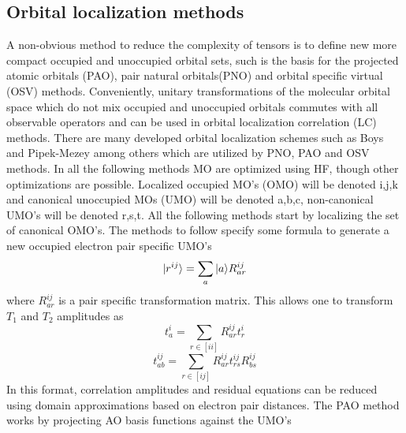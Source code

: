 	\subsection{Orbital localization methods}
		A non-obvious method to reduce the complexity of tensors is to define new more compact occupied and unoccupied orbital sets, such is the basis for the projected atomic orbitals (PAO), pair natural orbitals(PNO) and orbital specific virtual (OSV) methods. Conveniently, unitary transformations of the molecular orbital space which do not mix occupied and unoccupied orbitals commutes with all observable operators\cite{SzaboAttila1982} and can be used in orbital localization correlation (LC) methods. There are many developed orbital localization schemes such as Boys and Pipek-Mezey\cite{Boughton1993} among others which are utilized by PNO, PAO and OSV methods.  In all the following methods MO are optimized using HF, though other optimizations are possible. Localized occupied MO's (OMO) will be denoted i,j,k and canonical unoccupied MOs (UMO) will be denoted a,b,c, non-canonical UMO's will be denoted r,s,t.  All the following methods start by localizing the set of canonical OMO's. The methods to follow specify some formula to generate a new occupied electron pair specific UMO's 
			\begin{equation}
				| r^{ij} \rangle = \sum_a | a \rangle R^{ij}_{ar}
			\end{equation}
		where $R^{ij}_{ar}$ is a pair specific transformation matrix. This allows one to transform $T_1$ and $T_2$ amplitudes as 
			\begin{equation}
				t^i_a = \sum_{r\in[ii]} R^{ij}_{ar}t^i_r
			\end{equation}
			\begin{equation}
			t^{ij}_{ab} = \sum_{r\in[ij]} R^{ij}_{ar}t^{ij}_{rs}R^{ij}_{bs}
			\end{equation}
		In this format, correlation amplitudes and residual equations can be reduced using domain approximations based on electron pair distances\cite{yang2012}.
		The PAO method works by projecting AO basis functions against the UMO's\cite{pulay1983}
